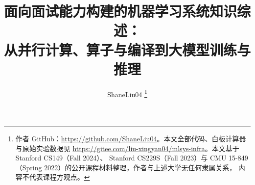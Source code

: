 \documentclass[journal,10pt]{IEEEtran}
\begin{document}
\title{面向面试能力构建的机器学习系统知识综述：\\从并行计算、算子与编译到大模型训练与推理}

\author{ShaneLiu04%
\thanks{作者 GitHub：\url{https://github.com/ShaneLiu04}。本文全部代码、白板计算器与原始实验数据见
\url{https://gitee.com/liu-xingyan04/mlsys-infra}。本文基于 Stanford CS149（Fall 2024）、
Stanford CS229S（Fall 2023）与 CMU 15-849（Spring 2022）的公开课程材料整理，作者与上述大学无任何隶属关系，
内容不代表课程方观点。}}


\maketitle
















\appendices


\clearpage


\end{document}
